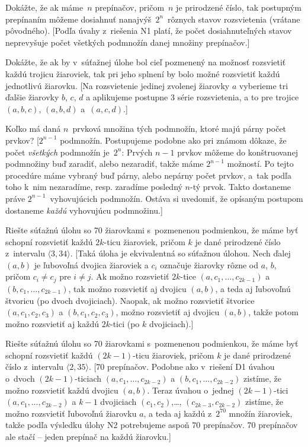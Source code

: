 {Dokážte, že ak máme~$n$ prepínačov, pričom~$n$ je
prirodzené číslo, tak postupným prepínaním môžeme dosiahnuť
nanajvýš~$2^n$~rôznych stavov rozsvietenia (vrátane pôvodného).
[Podľa úvahy z~riešenia N1 platí, že počet dosiahnuteľných stavov
neprevyšuje počet všetkých podmnožín danej množiny prepínačov.]

Dokážte, že ak by v~súťažnej úlohe bol cieľ pozmenený na
možnosť rozsvietiť každú trojicu žiaroviek, tak
pri jeho splnení by bolo možné rozsvietiť každú
jednotlivú žiarovku.
[Na rozsvietenie jedinej zvolenej žiarovky $a$ vyberieme tri ďalšie
žiarovky $b$, $c$, $d$ a aplikujeme postupne 3 série rozsvietenia,
a to pre trojice $(a,b,c)$, $(a,b,d)$ a~$(a,c,d)$.]

Koľko má daná $n$~prvková množina tých podmnožín, ktoré majú párny
počet prvkov?
[$2^{n-1}$ podmnožín. Postupujeme podobne ako pri známom dôkaze,
že počet {\it všetkých\/} podmnožín je~$2^n$: Prvých $n-1$ prvkov
môžeme do konštruovanej podmnožiny buď zaradiť, alebo nezaradiť,
takže máme $2^{n-1}$ možností. Po tejto procedúre máme vybraný
buď párny, alebo nepárny počet prvkov, a~tak podľa toho k~nim
nezaradíme, resp. zaradíme posledný $n$-tý prvok.
Takto dostaneme práve $2^{n-1}$~vyhovujúcich podmnožín.
Ostáva si uvedomiť, že opísaným postupom dostaneme {\it každú\/}
vyhovujúcu podmnožinu.]

\D
Riešte súťažnú úlohu so 70 žiarovkami s~pozmenenou podmienkou,
že máme byť schopní rozsvietiť každú $2k$-ticu žiaroviek, pričom
$k$ je dané prirodzené číslo z~intervalu $\langle 3,34\rangle$.
[Taká úloha je ekvivalentná so súťažnou úlohou. Nech ďalej
$(a,b)$ je ľubovoľná dvojica žiaroviek a $c_i$ označuje žiarovky rôzne
od $a$, $b$, pričom $c_i\ne c_j$ pre $i\ne j$. Ak možno rozsvietiť
$2k$-tice $(a,c_1,\ldots,c_{2k-1})$ a
$(b,c_1,\ldots,c_{2k-1})$, tak možno rozsvietiť aj dvojicu $(a,b)$,
a teda aj ľubovoľnú štvoricu (po dvoch dvojiciach).
Naopak, ak možno rozsvietiť štvorice $(a,c_1,c_2,c_3)$
a $(b,c_1,c_2,c_3)$, možno rozsvietiť aj dvojicu $(a,b)$,
takže potom možno rozsvietiť aj každú $2k$-tici (po $k$ dvojiciach).]

Riešte súťažnú úlohu so 70 žiarovkami s~pozmenenou podmienkou,
že máme byť schopní rozsvietiť každú $(2k-1)$-ticu žiaroviek, pričom
$k$ je dané prirodzené číslo z~intervalu $\langle 2,35\rangle$.
[70 prepínačov. Podobne ako v~riešení D1 úvahou o~dvoch $(2k-1)$-ticiach
$(a,c_1,\ldots,c_{2k-2})$ a $(b,c_1,\ldots,c_{2k-2})$ zistíme,
že možno rozsvietiť každú dvojicu $(a,b)$. Teraz úvahou o~jednej
$(2k-1)$-tici $(a,c_1,\ldots,c_{2k-2})$ a $k-1$ dvojiciach
$(c_1,c_2)$,\dots, $(c_{2k-3},c_{2k-2})$ zistíme, že možno
rozsvietiť ľubovoľnú žiarovku $a$, a teda aj každú z~$2^{70}$
množín žiaroviek, takže podľa výsledku úlohy N2
potrebujeme aspoň $70$ prepínačov. 70 prepínačov ale stačí --
jeden prepínač na každú žiarovku.]

}

